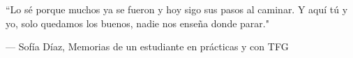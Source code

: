 
\epigraph{``Lo sé porque muchos ya se fueron y hoy sigo sus pasos al caminar. Y aquí tú y yo, solo quedamos los buenos, nadie nos enseña donde parar."}{--- \textup{Sof\'ia D\'iaz}, Memorias de un estudiante en pr\'acticas y con TFG}
